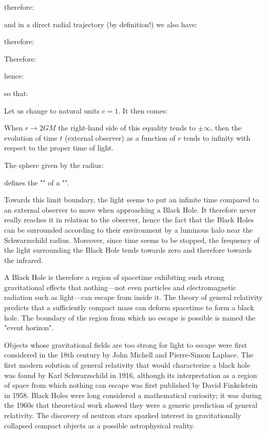 	therefore:
	
	and in a direct radial trajectory (by definition!) we also have:
	
	therefore:
	
	Therefore:
	
	hence:
	
	so that:
	
	Let us change to natural units $c=1$. It then comes:
	
	When $r\rightarrow 2GM$ the right-hand side of this equality tends to $\pm \infty$, then the evolution of time $t$ (external observer) as a function of $r$ tends to infinity with respect to the proper time of light.

	The sphere given by the radius:
	
	defines the "" of a "".
	
	Towards this limit boundary, the light seems to put an infinite time compared to an external observer to move when approaching a Black Hole. It therefore never really reaches it in relation to the observer, hence the fact that the Black Holes can be surrounded according to their environment by a luminous halo near the Schwarzschild radius. Moreover, since time seems to be stopped, the frequency of the light surrounding the Black Hole tends towards zero and therefore towards the infrared.

	A Black Hole is therefore a region of spacetime exhibiting such strong gravitational effects that nothing—not even particles and electromagnetic radiation such as light—can escape from inside it. The theory of general relativity predicts that a sufficiently compact mass can deform spacetime to form a black hole. The boundary of the region from which no escape is possible is named the "event horizon". 

	Objects whose gravitational fields are too strong for light to escape were first considered in the 18th century by John Michell and Pierre-Simon Laplace. The first modern solution of general relativity that would characterize a black hole was found by Karl Schwarzschild in 1916, although its interpretation as a region of space from which nothing can escape was first published by David Finkelstein in 1958. Black Holes were long considered a mathematical curiosity; it was during the 1960s that theoretical work showed they were a generic prediction of general relativity. The discovery of neutron stars sparked interest in gravitationally collapsed compact objects as a possible astrophysical reality.

